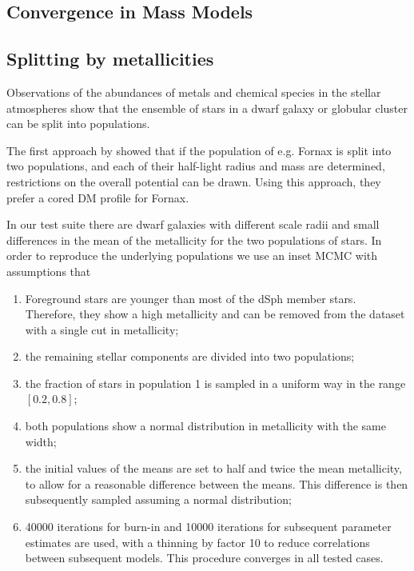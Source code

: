 \subsection{Convergence in Mass Models}



\subsection{Splitting by metallicities}\label{sec:metals}

Observations of the abundances of metals and chemical species in the
stellar atmospheres show that the ensemble of stars in a dwarf galaxy
or globular cluster can be split into populations.

The first approach by \cite{WalkerPenarrubia2012} showed that if the
population of e.g. Fornax is split into two populations, and each of
their half-light radius and mass are determined, restrictions on the
overall potential can be drawn. Using this approach, they prefer a
cored DM profile for Fornax.

In our test suite there are dwarf galaxies with different scale radii
and small differences in the mean of the metallicity for the two
populations of stars. In order to reproduce the underlying populations
we use an inset MCMC with assumptions that

\begin{enumerate}
\item Foreground stars are younger than most of the dSph member
  stars. Therefore, they show a high metallicity and can be removed
  from the dataset with a single cut in metallicity;
\item the remaining stellar components are divided into two
  populations;
\item the fraction of stars in population 1 is sampled in a uniform
  way in the range $[0.2,0.8]$;
\item both populations show a normal distribution in metallicity with
  the same width;
\item the initial values of the means are set to half and twice the
  mean metallicity, to allow for a reasonable difference between the
  means. This difference is then subsequently sampled assuming a
  normal distribution;
\item 40000 iterations for burn-in and 10000 iterations for subsequent
  parameter estimates are used, with a thinning by factor 10 to reduce
  correlations between subsequent models. This procedure converges in
  all tested cases.
\end{enumerate}

